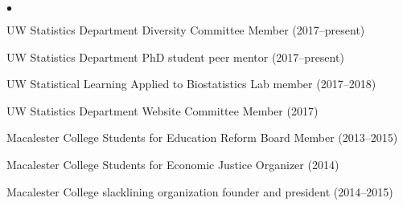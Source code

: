 \documentclass[margin,centered]{res}
\newenvironment{list1}{
  \begin{list}{\ding{113}}{%
      \setlength{\itemsep}{0in}
      \setlength{\parsep}{0in} \setlength{\parskip}{0in}
      \setlength{\topsep}{0in} \setlength{\partopsep}{0in}
      \setlength{\leftmargin}{0.17in}}}{\end{list}}
\newenvironment{list2}{
  \begin{list}{$\bullet$}{%
      \setlength{\itemsep}{0in}
      \setlength{\parsep}{0in} \setlength{\parskip}{0in}
      \setlength{\topsep}{0in} \setlength{\partopsep}{0in}
      \setlength{\leftmargin}{0.2in}}}{\end{list}}
\begin{document}
\begin{resume}
\begin{list1}
\item[]
\begin{list2}
\vspace*{.05in}
\item UW Statistics Department Diversity Committee Member (2017--present)
\item UW Statistics Department PhD student peer mentor (2017--present)
\item UW Statistical Learning Applied to Biostatistics Lab member (2017--2018)
\item UW Statistics Department Website Committee Member (2017)
\item Macalester College Students for Education Reform Board Member (2013--2015)
\item Macalester College Students for Economic Justice Organizer (2014)
\item Macalester College slacklining organization founder and president (2014--2015)
\end{list2}
\end{list1}



\thispagestyle{lastpage}
\end{resume}
\end{document}
